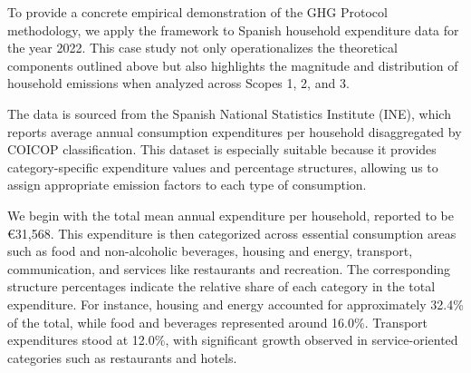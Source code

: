 \documentclass[12pt,a4paper]{article}
\begin{document}
To provide a concrete empirical demonstration of the GHG Protocol methodology, we apply the framework to Spanish household expenditure data for the year 2022. This case study not only operationalizes the theoretical components outlined above but also highlights the magnitude and distribution of household emissions when analyzed across Scopes 1, 2, and 3.

The data is sourced from the Spanish National Statistics Institute (INE), which reports average annual consumption expenditures per household disaggregated by COICOP classification. This dataset is especially suitable because it provides category-specific expenditure values and percentage structures, allowing us to assign appropriate emission factors to each type of consumption.

We begin with the total mean annual expenditure per household, reported to be €31,568. This expenditure is then categorized across essential consumption areas such as food and non-alcoholic beverages, housing and energy, transport, communication, and services like restaurants and recreation. The corresponding structure percentages indicate the relative share of each category in the total expenditure. For instance, housing and energy accounted for approximately 32.4\% of the total, while food and beverages represented around 16.0\%. Transport expenditures stood at 12.0\%, with significant growth observed in service-oriented categories such as restaurants and hotels.

\begin{table}[h]
\centering
\caption{Mean Consumption Expenditure per Household in Spain, 2022}
\label{tab:expenditure}
\end{table}
\end{document}

